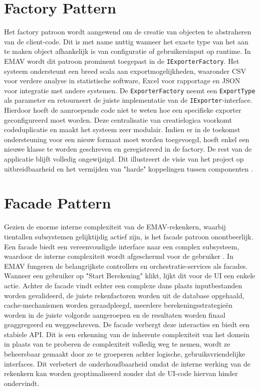 \section{Factory Pattern}
Het factory patroon wordt aangewend om de creatie van objecten te abstraheren van de client-code. 
Dit is met name nuttig wanneer het exacte type van het aan te maken object afhankelijk is van configuratie of gebruikersinput op runtime. 
In EMAV wordt dit patroon prominent toegepast in de \texttt{IExporterFactory}.
Het systeem ondersteunt een breed scala aan exportmogelijkheden, waaronder CSV voor verdere analyse in statistische software, Excel voor rapportage en JSON voor integratie met andere systemen. 
De \texttt{ExporterFactory} neemt een \texttt{ExportType} als parameter en retourneert de juiste implementatie van de \texttt{IExporter}-interface. 
Hierdoor hoeft de aanroepende code niet te weten hoe een specifieke exporter geconfigureerd moet worden.
Deze centralisatie van creatielogica voorkomt codeduplicatie en maakt het systeem zeer modulair. 
Indien er in de toekomst ondersteuning voor een nieuw formaat moet worden toegevoegd, hoeft enkel een nieuwe klasse te worden geschreven en geregistreerd in de factory. 
De rest van de applicatie blijft volledig ongewijzigd. 
Dit illustreert de visie van het project op uitbreidbaarheid en het vermijden van "harde" koppelingen tussen componenten \autocite{gof1994}.
\section{Facade Pattern}
Gezien de enorme interne complexiteit van de EMAV-rekenkern, waarbij tientallen subsystemen gelijktijdig actief zijn, is het facade patroon onontbeerlijk. 
Een facade biedt een vereenvoudigde interface naar een complex subsysteem, waardoor de interne complexiteit wordt afgeschermd voor de gebruiker \autocite{gof1994}. 
In EMAV fungeren de belangrijkste controllers en orchestratie-services als facades.
Wanneer een gebruiker op "Start Berekening" klikt, lijkt dit voor de UI een enkele actie. 
Achter de facade vindt echter een complexe dans plaats\: inputbestanden worden gevalideerd, de juiste rekenfactoren worden uit de database opgehaald, cache-mechanismen worden geraadpleegd, meerdere berekeningsstrategieën worden in de juiste volgorde aangeroepen en de resultaten worden finaal geaggregeerd en weggeschreven. 
De facade verbergt deze interacties en biedt een stabiele API.
Dit is een erkenning van de inherente complexiteit van het domein\: in plaats van te proberen de complexiteit volledig weg te nemen, wordt ze beheersbaar gemaakt door ze te groeperen achter logische, gebruiksvriendelijke interfaces. Dit verbetert de onderhoudbaarheid omdat de interne werking van de rekenkern kan worden geoptimaliseerd zonder dat de UI-code hiervan hinder ondervindt.
